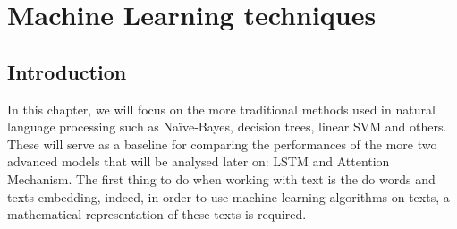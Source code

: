 ﻿\chapter{Machine Learning techniques} \label{chap3}
\section{Introduction}
In this chapter, we will focus on the more traditional methods used in natural language processing such as Na\"{i}ve-Bayes, decision trees, linear SVM and others. These will serve as a baseline for comparing the performances of the more two advanced models that will be analysed later on: LSTM and Attention Mechanism. The first thing to do when working with text is the do words and texts embedding, indeed, in order to use machine learning algorithms on texts, a mathematical representation of these texts is required. 
